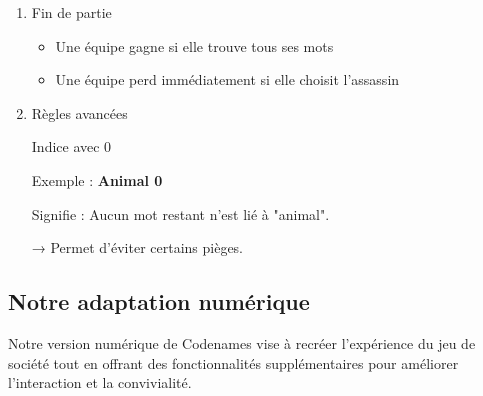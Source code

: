 \documentclass[12pt,a4paper]{article}
\begin{document}
\begin{enumerate}
\begin{enumerate}
\begin{enumerate}
                            \end{enumerate}

                    \end{enumerate}
                
                \vspace{0.5cm}
                \item Fin de partie

                    \begin{itemize}
                        \item Une équipe gagne si elle trouve tous ses mots
                        \item Une équipe perd immédiatement si elle choisit l’assassin
                    \end{itemize}
                
                \vspace{0.5cm}
                \item Règles avancées

                    Indice avec 0

                    \begin{tcolorbox}
                    Exemple : \textbf{Animal 0}
                    \end{tcolorbox}

                    Signifie :
                    Aucun mot restant n’est lié à "animal".

                    → Permet d’éviter certains pièges.

            \end{enumerate}
        
        \subsection{Notre adaptation numérique}
            Notre version numérique de Codenames vise à recréer l'expérience du jeu de société tout en offrant des fonctionnalités supplémentaires pour améliorer l'interaction et la convivialité.

            \vspace{0.5cm}
\end{document}
